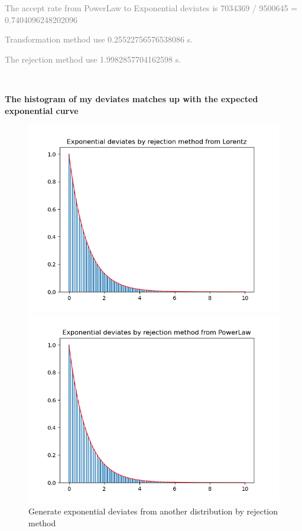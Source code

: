 \documentclass[showpacs, oneside, onecolumn, prl, amsmath, amssymb, nofootinbib, superscriptaddress, notitlepage]{revtex4-1}
\newcommand\bfig{\begin{figure}}
\newcommand\efig{\end{figure}}
\newcommand\gray{\textcolor{gray}}
\begin{document}
\gray{The accept rate from PowerLaw to Exponential deviates is 7034369 / 9500645 = 0.7404096248202096}

\gray{Transformation method use 0.25522756576538086 s.}

\gray{The rejection method use 1.9982857704162598 s.}

~~~~

\textbf{The histogram of my deviates matches up with the expected exponential curve}

\bfig
	\centering
	\subfigure
	{\begin{minipage}[b]{1\textwidth}
	\includegraphics[scale=0.8]{6-2-1.png}
	\end{minipage}}
	\subfigure
	{\begin{minipage}[b]{1\textwidth}
	\includegraphics[scale=0.8]{6-2-2.png}
	\end{minipage}}
	\caption{Generate exponential deviates from another distribution by rejection method}
	\label{6-2}
\efig
\end{document}
